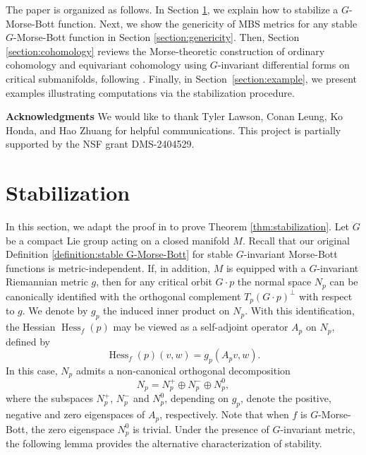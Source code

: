 \documentclass[11pt]{amsart}
\theoremstyle{definition}
\numberwithin{equation}{subsection}
\DeclareMathOperator{\Hess}{Hess}
\begin{document}
The paper is organized as follows.
In Section \ref{section:stabilization}, we explain how to stabilize a $G$-Morse-Bott function. Next, we show the genericity of MBS metrics for any stable $G$-Morse-Bott function in Section \ref{section:genericity}. Then, Section \ref{section:cohomology} reviews the Morse-theoretic construction of ordinary cohomology and equivariant cohomology using $G$-invariant differential forms on critical submanifolds, following \cite{AustinBraam,zhuang2025analytictopologicalrealizationsinvariant}. Finally, in 
Section~\ref{section:example}, we present examples illustrating computations via 
the stabilization procedure.

\medskip

\textbf{Acknowledgments}
We would like to thank Tyler Lawson, 
Conan Leung, Ko Honda, and Hao Zhuang for helpful communications. This project is partially supported by the NSF grant DMS-2404529.

\section{Stabilization}\label{section:stabilization}
In this section, we adapt the proof in \cite{bao2024morse} to prove Theorem \ref{thm:stabilization}. Let $G$ be a compact Lie group acting on a closed manifold $M$. Recall that our original Definition \ref{definition:stable G-Morse-Bott} for stable $G$-invariant Morse-Bott functions is metric-independent. If, in addition, $M$ is equipped with a $G$-invariant Riemannian metric $g$, then 
for any critical orbit $G\cdot p$ the normal space $N_p$ can be canonically 
identified with the orthogonal complement $T_p(G\cdot p)^{\perp}$ with respect to 
$g$. We denote by $g_p$ the induced inner product on $N_p$. With this 
identification, the Hessian $\Hess_f(p)$ may be viewed as a self-adjoint operator 
$A_p$ on $N_p$, defined by
\[
\Hess_f(p)(v,w) = g_p(A_p v, w).
\]
In this case, $N_p$ admits a non-canonical orthogonal decomposition \[
N_{p} = N^{+}_{p} \oplus N^{-}_{p}\oplus N_p^0,
\]
where the subspaces $N^{+}_{p}$, $N^{-}_{p}$ and $N^0_p$, depending on $g_p$, denote the positive, negative and zero eigenspaces of $A_p$, respectively. Note that when $f$ is $G$-Morse-Bott, the zero eigenspace $N_p^0$ is trivial. Under the presence of $G$-invariant metric, the following lemma provides the alternative characterization of stability.
\end{document}

